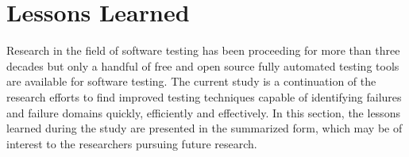 




\section{Lessons Learned}
Research in the field of software testing has been proceeding for more than three decades but only a handful of free and open source fully automated testing tools are available for software testing. The current study is a continuation of the research efforts to find improved testing techniques capable of identifying failures and failure domains quickly, efficiently and effectively. In this section, the lessons learned during the study are presented in the summarized form, which may be of interest to the researchers pursuing future research.

